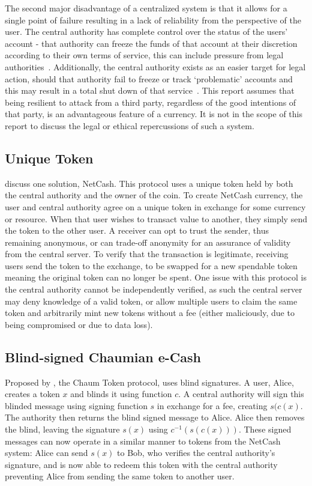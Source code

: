 The second major disadvantage of a centralized system is that it allows  for  a single point of failure resulting in a lack of reliability from   the  perspective of the user.  The central authority has complete  control over the status of the users' account - that authority can   freeze the funds of that account at their discretion according to their  own terms of service, this can include pressure from legal  authorities~\cite{mtgox-dwolla,vlad:mtgox-dwolla}.   Additionally, the central authority exists as an easier target for  legal  action, should that authority fail to freeze or track  `problematic'  accounts and this may result in a total shut down of  that  service~\cite{lr-shutdown,lr-idictment}. This  report assumes that being resilient  to attack from a third party, regardless of the good intentions of that  party, is an advantageous feature of a  currency.  It is not in the  scope of this report to discuss the legal or ethical repercussions of  such a system.

\subsection{Unique Token}
\textcite{netcash} discuss one solution, NetCash.  This protocol uses a unique token held by both the central authority and the owner of the coin. To create NetCash currency, the user and central authority agree on a unique token in exchange for some currency or resource. When that user wishes to transact value to another, they simply send the token to the other user.  A receiver can opt to trust the sender, thus remaining anonymous, or can trade-off anonymity for an assurance of validity from the central server.  To verify that the transaction is legitimate, receiving users send the token to the exchange, to be swapped for a new spendable token meaning the original token can no longer be spent. One issue with this protocol is the central authority cannot be independently verified, as such the central server may deny knowledge of a valid token, or allow multiple users to claim the same token and arbitrarily mint new tokens without a fee (either maliciously, due to being compromised or due to data loss).

\subsection{Blind-signed Chaumian e-Cash}
Proposed by \textcite{chaum}, the Chaum Token protocol, uses blind signatures. A user, Alice, creates a token $x$ and blinds it using function $c$.  A central authority will sign this blinded message using signing function $s$ in exchange for a fee, creating $s(c(x)$.  The authority then returns the blind signed message to Alice. Alice then removes the blind, leaving the signature $s(x)$ using $c^{-1}(s(c(x)))$.  These signed messages can now operate in a similar manner to tokens from the NetCash system: Alice can send $s(x)$ to Bob, who verifies the central authority's signature, and is now able to redeem this token with the central authority preventing Alice from sending the same token to another user.

